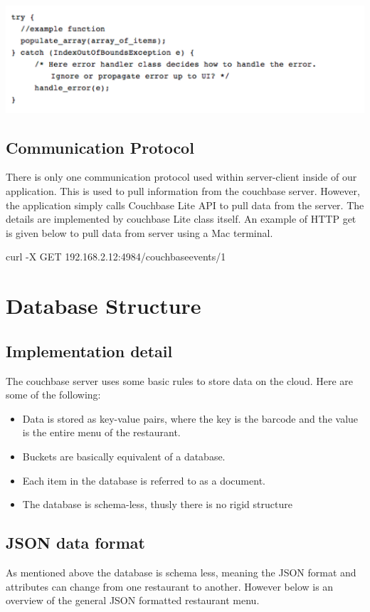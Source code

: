 \documentclass[12pt, titlepage]{article}
\begin{document}
\includegraphics[width=150mm,scale=0.5]{error.png}

\subsection{Communication Protocol}
There is only one communication protocol used within server-client inside of our application. This is used to pull information from the couchbase server. However, the application simply calls Couchbase Lite API to pull data from the server. The details are implemented by couchbase Lite class itself.  An example of HTTP get is given below to pull data from server using a Mac terminal. 

curl -X GET 192.168.2.12:4984/couchbaseevents/1

\section{Database Structure}

\subsection{Implementation detail}
The couchbase server uses some basic rules to store data on the cloud. Here are some of the following:
\begin{itemize}
  \item Data is stored as key-value pairs, where the key is the barcode and the value is the entire menu of the restaurant.
  \item Buckets are basically equivalent of a database.
  \item Each item in the database is referred to as a document.
  \item The database is schema-less, thusly there is no rigid structure
\end{itemize}

\subsection{JSON data format}
As mentioned above the database is schema less, meaning the JSON format and attributes can change from one restaurant to another. However below is an overview of the general JSON formatted restaurant menu.
\end{document}
